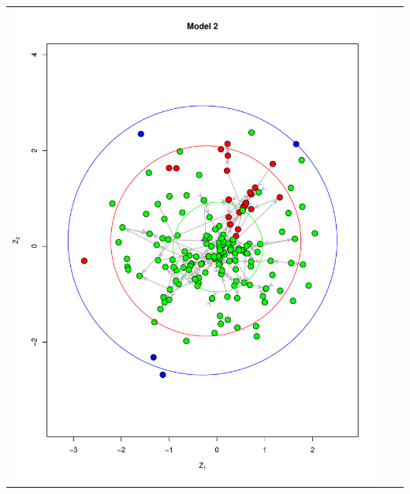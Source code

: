\documentclass[fleqn,12pt]{wlscirep}
\begin{document}
\begin{longtable}[!h]{ccc}
\includegraphics[height=.3\textheight, clip=true, trim=2.05cm 2.55cm 1cm 2cm]{figures/LSM_m2.pdf}  
&

\end{longtable}
\end{document}
